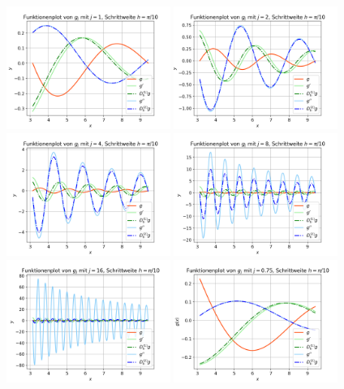 \documentclass{scrartcl}
\begin{document}
  \includegraphics[width=0.4\textwidth]{Grafiken/Funktionenplot_j1_Pi_Zehntel}
  \includegraphics[width=0.4\textwidth]{Grafiken/Funktionenplot_j2_Pi_Zehntel}
  \includegraphics[width=0.4\textwidth]{Grafiken/Funktionenplot_j4_Pi_Zehntel}
  \includegraphics[width=0.4\textwidth]{Grafiken/Funktionenplot_j8_Pi_Zehntel}
  \includegraphics[width=0.4\textwidth]{Grafiken/Funktionenplot_j16_Pi_Zehntel}
  \includegraphics[width=0.4\textwidth]{Grafiken/Funktionenplot_j075_Pi_Zehntel}
\end{document}
